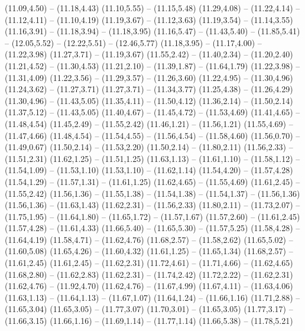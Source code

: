 {  (11.09,4.50) -- (11.18,4.43)
  (11.10,5.55) -- (11.15,5.48)
  (11.29,4.08) -- (11.22,4.14) -- (11.12,4.11) -- (11.10,4.19)
  (11.19,3.67) -- (11.12,3.63)
  (11.19,3.54) -- (11.14,3.55)
  (11.16,3.91) -- (11.18,3.94) -- (11.18,3.95)
  (11.16,5.47) -- (11.43,5.40) -- (11.85,5.41) -- (12.05,5.52) -- (12.22,5.51) -- (12.46,5.77)
  (11.18,3.95) -- (11.17,4.00) -- (11.22,3.98)
  (11.27,3.71) -- (11.19,3.67)
  (11.55,2.42) -- (11.40,2.34) -- (11.20,2.40)
  (11.21,4.52) -- (11.30,4.53)
  (11.21,2.10) -- (11.39,1.87) -- (11.64,1.79)
  (11.22,3.98) -- (11.31,4.09)
  (11.22,3.56) -- (11.29,3.57) -- (11.26,3.60)
  (11.22,4.95) -- (11.30,4.96)
  (11.24,3.62) -- (11.27,3.71)
  (11.27,3.71) -- (11.34,3.77)
  (11.25,4.38) -- (11.26,4.29)
  (11.30,4.96) -- (11.43,5.05)
  (11.35,4.11) -- (11.50,4.12)
  (11.36,2.14) -- (11.50,2.14)
  (11.37,5.12) -- (11.43,5.05)
  (11.40,4.67) -- (11.45,4.72) -- (11.53,4.69)
  (11.41,4.65) -- (11.48,4.54)
  (11.45,2.49) -- (11.55,2.42)
  (11.46,1.21) -- (11.56,1.21)
  (11.55,4.69) -- (11.47,4.66)
  (11.48,4.54) -- (11.54,4.55) -- (11.56,4.54) -- (11.58,4.60)
  (11.56,0.70) -- (11.49,0.67)
  (11.50,2.14) -- (11.53,2.20)
  (11.50,2.14) -- (11.80,2.11)
  (11.56,2.33) -- (11.51,2.31)
  (11.62,1.25) -- (11.51,1.25)
  (11.63,1.13) -- (11.61,1.10) -- (11.58,1.12) -- (11.54,1.09) -- (11.53,1.10)
  (11.53,1.10) -- (11.62,1.14)
  (11.54,4.20) -- (11.57,4.28)
  (11.54,1.29) -- (11.57,1.31) -- (11.61,1.25)
  (11.62,4.65) -- (11.55,4.69)
  (11.61,2.45) -- (11.55,2.42)
  (11.56,1.36) -- (11.55,1.38) -- (11.54,1.38) -- (11.54,1.37) -- (11.56,1.36)
  (11.56,1.36) -- (11.63,1.43)
  (11.62,2.31) -- (11.56,2.33)
  (11.80,2.11) -- (11.73,2.07) -- (11.75,1.95) -- (11.64,1.80) -- (11.65,1.72) -- (11.57,1.67)
  (11.57,2.60) -- (11.61,2.45)
  (11.57,4.28) -- (11.61,4.33)
  (11.66,5.40) -- (11.65,5.30) -- (11.57,5.25)
  (11.58,4.28) -- (11.64,4.19)
  (11.58,4.71) -- (11.62,4.76)
  (11.68,2.57) -- (11.58,2.62)
  (11.65,5.02) -- (11.60,5.08)
  (11.65,4.26) -- (11.60,4.32)
  (11.61,1.25) -- (11.65,1.34)
  (11.68,2.57) -- (11.61,2.45)
  (11.61,2.45) -- (11.62,2.31)
  (11.72,4.61) -- (11.71,4.66) -- (11.62,4.65)
  (11.68,2.80) -- (11.62,2.83)
  (11.62,2.31) -- (11.74,2.42)
  (11.72,2.22) -- (11.62,2.31)
  (11.62,4.76) -- (11.92,4.70)
  (11.62,4.76) -- (11.67,4.99)
  (11.67,4.11) -- (11.63,4.06)
  (11.63,1.13) -- (11.64,1.13) -- (11.67,1.07)
  (11.64,1.24) -- (11.66,1.16)
  (11.71,2.88) -- (11.65,3.04)
  (11.65,3.05) -- (11.77,3.07)
  (11.70,3.01) -- (11.65,3.05)
  (11.77,3.17) -- (11.66,3.15)
  (11.66,1.16) -- (11.69,1.14) -- (11.77,1.14)
  (11.66,5.38) -- (11.78,5.21)
}
